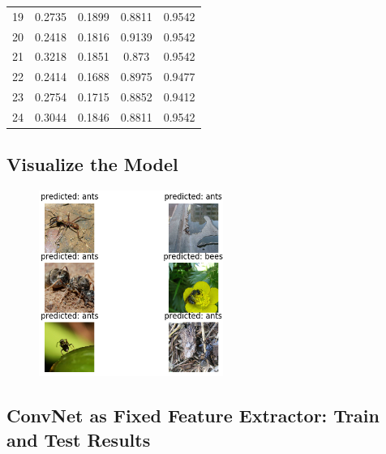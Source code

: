 \documentclass[12pt]{article}
\begin{document}
\begin{table}[h]
{\begin{tabular}{lcccc}
				19    & 0.2735     & 0.1899           & 0.8811         & 0.9542              \\
				20    & 0.2418     & 0.1816           & 0.9139         & 0.9542              \\
				21    & 0.3218     & 0.1851           & 0.873          & 0.9542              \\
				22    & 0.2414     & 0.1688           & 0.8975         & 0.9477              \\
				23    & 0.2754     & 0.1715           & 0.8852         & 0.9412              \\
				24    & 0.3044     & 0.1846           & 0.8811         & 0.9542              \\ \hline
			\end{tabular}
		}
	\end{table}
	
	\subsection{Visualize the Model}
	
	\begin{figure}[h]
		\centering
		\includegraphics[width=6cm]{Figure_5.png}
		\label{fig:sub1}
	\end{figure}
	\newpage
	\subsection{ConvNet as Fixed Feature Extractor: Train and Test Results}
	
\end{document}

